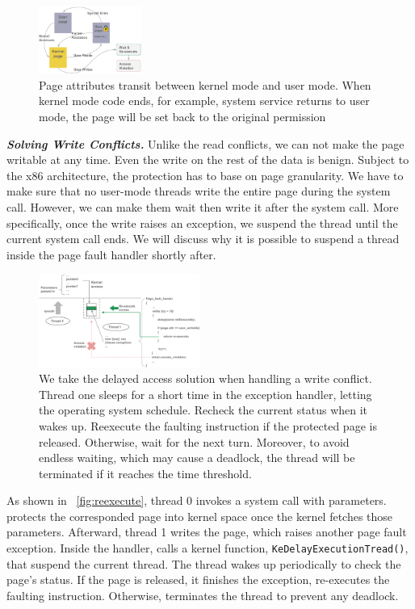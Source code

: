 \begin{figure}[th]
  \includegraphics[width=0.30\textwidth]{figures/pagestate}
  \centering
  \caption{Page attributes transit between kernel mode and user mode. When kernel mode code ends, for example, system service returns to user mode, the page will be set back to the original permission}
  \label{fig:pagestate}
\end{figure}




\textbf{\textit{Solving Write Conflicts.}} Unlike the read conflicts, we can not make the page writable at any time. Even the write on the rest of the data is benign. Subject to the x86 architecture, the protection has to base on page granularity. We have to make sure that no user-mode threads write the entire page during the system call. However, we can make them wait then write it after the system call. More specifically, once the write raises an exception, we suspend the thread until the current system call ends. We will discuss why it is possible to suspend a thread inside the page fault handler shortly after.


\begin{figure}[th]
  \includegraphics[width=0.47\textwidth]{figures/reexecute}
  \centering
  \caption{We take the delayed access solution when handling a write conflict. Thread one sleeps for a short time in the exception handler, letting the operating system schedule. Recheck the current status when it wakes up. Reexecute the faulting instruction if the protected page is released. Otherwise, wait for the next turn. Moreover, to avoid endless waiting, which may cause a deadlock, the thread will be terminated if it reaches the time threshold.}
  \label{fig:reexecute}
\end{figure}


As shown in ~\autoref{fig:reexecute}, thread 0 invokes a system call with parameters.  \name protects the corresponded page into kernel space once the kernel fetches those parameters. Afterward, thread 1 writes the page, which raises another page fault exception. Inside the handler, \name calls a kernel function, \texttt{KeDelayExecutionTread()}, that suspend the current thread. The thread wakes up periodically to check the page's status. If the page is released, it finishes the exception, re-executes the faulting instruction. Otherwise, \name terminates the thread to prevent any deadlock.

